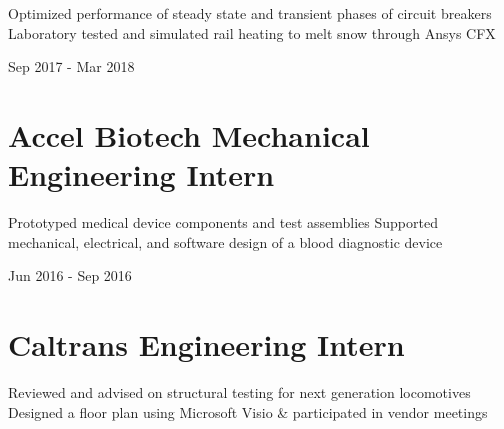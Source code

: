 \documentclass[letterpaper,10pt,oneside]{article}
\begin{document}
\begin{body}
\begin{detail}
\BulletItem
\vspace{-2.5ex}
\begin{detail}

\BulletItem
 Optimized performance of steady state and transient phases of circuit breakers
\BulletItem
 Laboratory tested and simulated rail heating to melt snow through Ansys CFX 
\end{detail}

\begin{subtitle}
\vspace{-7.8ex}
{{Sep 2017 - Mar 2018}}
\end{subtitle}
\vspace{0ex}


\section
{\textbf{Accel Biotech}
\newline
Mechanical Engineering Intern}

\BulletItem
\vspace{-2.5ex}
\begin{detail}
\BulletItem
Prototyped medical device components and test assemblies
\BulletItem
Supported mechanical, electrical, and software design of a blood diagnostic device
\end{detail}

\begin{subtitle}
\vspace{-7.8ex}
{{Jun 2016 - Sep 2016}}
\end{subtitle}
\vspace{0ex}


\section
{\textbf{Caltrans}
\newline
Engineering Intern
\newline
}

\BulletItem
\vspace{-2.5ex}
\begin{detail}
\BulletItem
Reviewed and advised on structural testing for next generation locomotives
\BulletItem
Designed a floor plan using Microsoft Visio \& participated in vendor meetings
\end{detail}


\end{detail}
\end{body}
\end{document}
